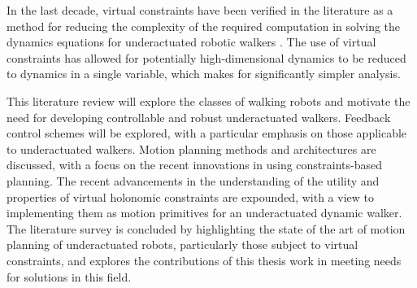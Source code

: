 In the last decade, virtual constraints have been verified in the literature as a method for reducing the complexity of the required computation in solving the dynamics equations for underactuated robotic walkers \cite{westervelt2003hybrid, shiriaev2005constructive, shih2007asymptotically}. The use of virtual constraints has allowed for potentially high-dimensional dynamics to be reduced to dynamics in a single variable, which makes for significantly simpler analysis.

This literature review will explore the classes of walking robots and motivate the need for developing controllable and robust underactuated walkers. Feedback control schemes will be explored, with a particular emphasis on those applicable to underactuated walkers. Motion planning methods and architectures are discussed, with a focus on the recent innovations in using constraints-based planning. The recent advancements in the understanding of the utility and properties of virtual holonomic constraints are expounded, with a view to implementing them as motion primitives for an underactuated dynamic walker. The literature survey is concluded by highlighting the state of the art of motion planning of underactuated robots, particularly those subject to virtual constraints, and explores the contributions of this thesis work in meeting needs for solutions in this field.